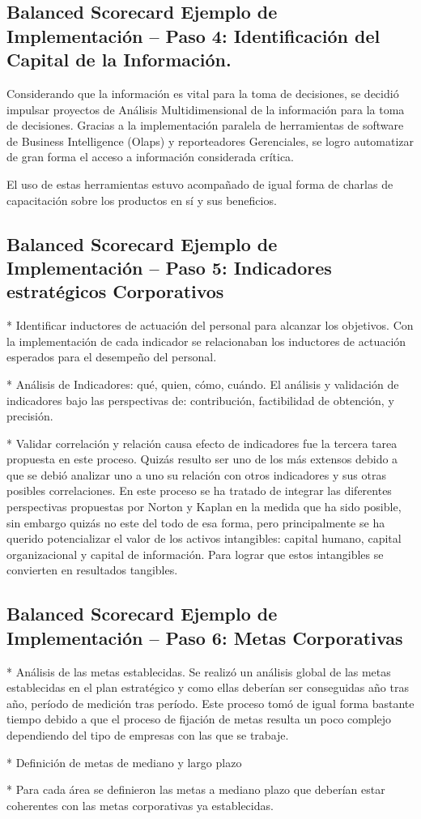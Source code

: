 \subsection{Balanced Scorecard Ejemplo de Implementación – Paso 4: Identificación del Capital de la Información.}
\item {Considerando que la información es vital para la toma de decisiones, se decidió impulsar proyectos de Análisis Multidimensional de la información para la toma de decisiones. Gracias a la implementación paralela de herramientas de software de Business Intelligence (Olaps) y reporteadores Gerenciales, se logro automatizar de gran forma el acceso a información considerada crítica.

El uso de estas herramientas estuvo acompañado de igual forma de charlas de capacitación sobre los productos en sí y sus beneficios.}

\subsection{Balanced Scorecard Ejemplo de Implementación – Paso 5: Indicadores estratégicos Corporativos}
\item {* Identificar inductores de actuación del personal para alcanzar los objetivos. Con la implementación de cada indicador se relacionaban los inductores de actuación esperados para el desempeño del personal.

* Análisis de Indicadores: qué, quien, cómo, cuándo. El análisis y validación de indicadores bajo las perspectivas de: contribución, factibilidad de obtención, y precisión.

* Validar correlación y relación causa efecto de indicadores fue la tercera tarea propuesta en este proceso. Quizás resulto ser uno de los más extensos debido a que se debió analizar uno a uno su relación con otros indicadores y sus otras posibles correlaciones. En este proceso se ha tratado de integrar las diferentes perspectivas propuestas por Norton y Kaplan en la medida que ha sido posible, sin embargo quizás no este del todo de esa forma, pero principalmente se ha querido potencializar el valor de los activos intangibles: capital humano, capital organizacional y capital de información. Para lograr que estos intangibles se convierten en resultados tangibles.}

\subsection{Balanced Scorecard Ejemplo de Implementación – Paso 6: Metas Corporativas}
\item {* Análisis de las metas establecidas. Se realizó un análisis global de las metas establecidas en el plan estratégico y como ellas deberían ser conseguidas año tras año, período de medición tras período.  Este proceso tomó de igual forma bastante tiempo debido a que el proceso de fijación de metas resulta un poco complejo dependiendo del tipo de empresas con las que se trabaje.

* Definición de  metas de mediano y largo plazo

* Para cada área se definieron las metas a mediano plazo que deberían estar coherentes con las metas corporativas ya establecidas.}

